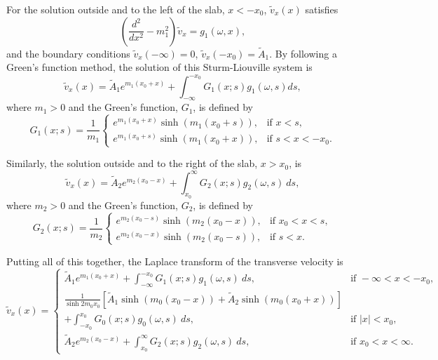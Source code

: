 \documentclass[12pt]{../style-files/ociamthesis}
\begin{document}
For the solution outside and to the left of the slab, $x < -x_0$, $\tilde{v}_x(x)$ satisfies
\begin{equation}
\left(\frac{d^2}{dx^2} - m_1^2 \right) \tilde{v}_x = g_1(\omega, x),
\end{equation}
and the boundary conditions $\tilde{v}_x(-\infty) = 0$, $\tilde{v}_x(-x_0) = \tilde{A}_1$. By following a Green's function method, the solution of this Sturm-Liouville system is
\begin{equation}
\tilde{v}_x(x) = \tilde{A}_1e^{m_1(x_0+x)} + \int_{-\infty}^{-x_0} G_1(x; s) g_1(\omega, s) ds,
\label{V sol 1}
\end{equation}
where $m_1 > 0$ and the Green's function, $G_1$, is defined by
\begin{equation}
G_1(x; s) = \frac{1}{m_1}
\begin{cases}
e^{m_1(x_0 + x)}\sinh(m_1(x_0 + s)), & \text{if } x < s, \\
e^{m_1(x_0 + s)}\sinh(m_1(x_0 + x)), & \text{if } s < x < -x_0.
\end{cases}
\end{equation}

Similarly, the solution outside and to the right of the slab, $x > x_0$, is
\begin{equation}
\tilde{v}_x(x) = \tilde{A}_2e^{m_2(x_0-x)} + \int_{x_0}^{\infty} G_2(x; s) g_2(\omega, s) ~ds,
\label{P sol 2}
\end{equation}
where $m_2 > 0$ and the Green's function, $G_2$, is defined by
\begin{equation}
G_2(x; s) = \frac{1}{m_2}
\begin{cases}
e^{m_2(x_0 - s)}\sinh(m_2(x_0 - x)), & \text{if } x_0 < x < s, \\
e^{m_2(x_0 - x)}\sinh(m_2(x_0 - s)), & \text{if } s < x.
\end{cases}
\end{equation}

Putting all of this together, the Laplace transform of the transverse velocity is
\begin{equation}
\tilde{v}_x(x) = 
\begin{cases}
\tilde{A}_1e^{m_1(x_0 + x)} + \int_{-\infty}^{-x_0} G_1(x; s) g_1(\omega, s) ~ds, & \text{if } -\infty < x < -x_0, \\

\frac{1}{\sinh{2m_0x_0}} \left[ \tilde{A}_1\sinh(m_0(x_0 - x)) + \tilde{A}_2\sinh(m_0(x_0 + x)) \right]  \\
+ \int_{-x_0}^{x_0} G_0(x; s) g_0(\omega, s) ~ds, & \text{if } |x| < x_0, \\

\tilde{A}_2e^{m_2(x_0 - x)} + \int_{x_0}^{\infty} G_2(x; s) g_2(\omega, s) ~ds, & \text{if } x_0 < x < \infty.
\end{cases}
\label{V sol}
\end{equation}
\end{document}
